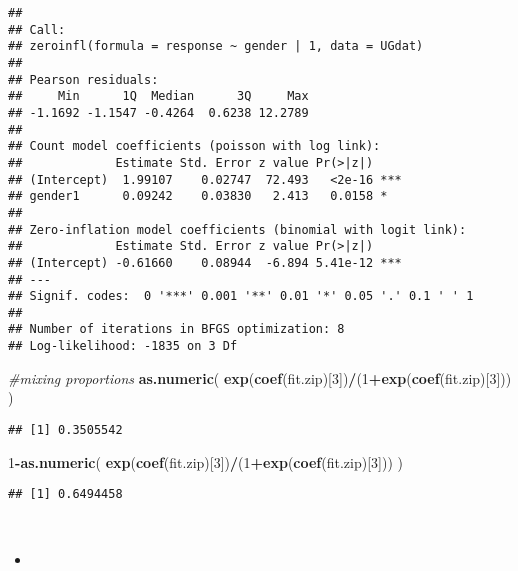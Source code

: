 \documentclass[]{article}
\newenvironment{Shaded}{\begin{snugshade}}{\end{snugshade}}
\newcommand{\KeywordTok}[1]{\textcolor[rgb]{0.13,0.29,0.53}{\textbf{#1}}}
\newcommand{\DecValTok}[1]{\textcolor[rgb]{0.00,0.00,0.81}{#1}}
\newcommand{\CommentTok}[1]{\textcolor[rgb]{0.56,0.35,0.01}{\textit{#1}}}
\newcommand{\OperatorTok}[1]{\textcolor[rgb]{0.81,0.36,0.00}{\textbf{#1}}}
\newcommand{\NormalTok}[1]{#1}
\begin{document}
\begin{verbatim}
## 
## Call:
## zeroinfl(formula = response ~ gender | 1, data = UGdat)
## 
## Pearson residuals:
##     Min      1Q  Median      3Q     Max 
## -1.1692 -1.1547 -0.4264  0.6238 12.2789 
## 
## Count model coefficients (poisson with log link):
##             Estimate Std. Error z value Pr(>|z|)    
## (Intercept)  1.99107    0.02747  72.493   <2e-16 ***
## gender1      0.09242    0.03830   2.413   0.0158 *  
## 
## Zero-inflation model coefficients (binomial with logit link):
##             Estimate Std. Error z value Pr(>|z|)    
## (Intercept) -0.61660    0.08944  -6.894 5.41e-12 ***
## ---
## Signif. codes:  0 '***' 0.001 '**' 0.01 '*' 0.05 '.' 0.1 ' ' 1 
## 
## Number of iterations in BFGS optimization: 8 
## Log-likelihood: -1835 on 3 Df
\end{verbatim}

\begin{Shaded}
\begin{Highlighting}[]
\CommentTok{#mixing proportions}
\KeywordTok{as.numeric}\NormalTok{( }\KeywordTok{exp}\NormalTok{(}\KeywordTok{coef}\NormalTok{(fit.zip)[}\DecValTok{3}\NormalTok{])}\OperatorTok{/}\NormalTok{(}\DecValTok{1}\OperatorTok{+}\KeywordTok{exp}\NormalTok{(}\KeywordTok{coef}\NormalTok{(fit.zip)[}\DecValTok{3}\NormalTok{])) )}
\end{Highlighting}
\end{Shaded}

\begin{verbatim}
## [1] 0.3505542
\end{verbatim}

\begin{Shaded}
\begin{Highlighting}[]
\DecValTok{1}\OperatorTok{-}\KeywordTok{as.numeric}\NormalTok{( }\KeywordTok{exp}\NormalTok{(}\KeywordTok{coef}\NormalTok{(fit.zip)[}\DecValTok{3}\NormalTok{])}\OperatorTok{/}\NormalTok{(}\DecValTok{1}\OperatorTok{+}\KeywordTok{exp}\NormalTok{(}\KeywordTok{coef}\NormalTok{(fit.zip)[}\DecValTok{3}\NormalTok{])) )}
\end{Highlighting}
\end{Shaded}

\begin{verbatim}
## [1] 0.6494458
\end{verbatim}

~

\begin{itemize}
     \item[] \vspace{1.5 in} 

 \end{itemize}
\end{document}
